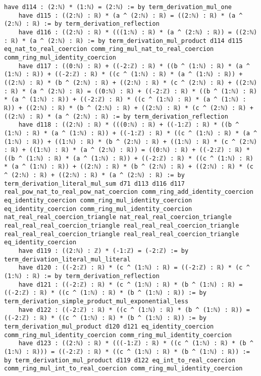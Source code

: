 \documentclass{article}
\begin{document}
\begin{tcolorbox}[colback=white!10, width=\linewidth]
\begin{lstlisting}[language=Lean4]
    have d114 : (2:ℕ) * (1:ℕ) = (2:ℕ) := by term_derivation_mul_one
    have d115 : ((2:ℕ) : ℝ) * (a ^ (2:ℕ) : ℝ) = ((2:ℕ) : ℝ) * (a ^ (2:ℕ) : ℝ) := by term_derivation_reflection
    have d116 : ((2:ℕ) : ℝ) * (((1:ℕ) : ℝ) * (a ^ (2:ℕ) : ℝ)) = ((2:ℕ) : ℝ) * (a ^ (2:ℕ) : ℝ) := by term_derivation_mul_product d114 d115 eq_nat_to_real_coercion comm_ring_mul_nat_to_real_coercion comm_ring_mul_identity_coercion
    have d117 : ((0:ℕ) : ℝ) + ((-2:ℤ) : ℝ) * ((b ^ (1:ℕ) : ℝ) * (a ^ (1:ℕ) : ℝ)) + ((-2:ℤ) : ℝ) * ((c ^ (1:ℕ) : ℝ) * (a ^ (1:ℕ) : ℝ)) + ((2:ℕ) : ℝ) * (b ^ (2:ℕ) : ℝ) + ((2:ℕ) : ℝ) * (c ^ (2:ℕ) : ℝ) + ((2:ℕ) : ℝ) * (a ^ (2:ℕ) : ℝ) = ((0:ℕ) : ℝ) + ((-2:ℤ) : ℝ) * ((b ^ (1:ℕ) : ℝ) * (a ^ (1:ℕ) : ℝ)) + ((-2:ℤ) : ℝ) * ((c ^ (1:ℕ) : ℝ) * (a ^ (1:ℕ) : ℝ)) + ((2:ℕ) : ℝ) * (b ^ (2:ℕ) : ℝ) + ((2:ℕ) : ℝ) * (c ^ (2:ℕ) : ℝ) + ((2:ℕ) : ℝ) * (a ^ (2:ℕ) : ℝ) := by term_derivation_reflection
    have d118 : ((2:ℕ) : ℝ) * (((0:ℕ) : ℝ) + ((-1:ℤ) : ℝ) * ((b ^ (1:ℕ) : ℝ) * (a ^ (1:ℕ) : ℝ)) + ((-1:ℤ) : ℝ) * ((c ^ (1:ℕ) : ℝ) * (a ^ (1:ℕ) : ℝ)) + ((1:ℕ) : ℝ) * (b ^ (2:ℕ) : ℝ) + ((1:ℕ) : ℝ) * (c ^ (2:ℕ) : ℝ) + ((1:ℕ) : ℝ) * (a ^ (2:ℕ) : ℝ)) = ((0:ℕ) : ℝ) + ((-2:ℤ) : ℝ) * ((b ^ (1:ℕ) : ℝ) * (a ^ (1:ℕ) : ℝ)) + ((-2:ℤ) : ℝ) * ((c ^ (1:ℕ) : ℝ) * (a ^ (1:ℕ) : ℝ)) + ((2:ℕ) : ℝ) * (b ^ (2:ℕ) : ℝ) + ((2:ℕ) : ℝ) * (c ^ (2:ℕ) : ℝ) + ((2:ℕ) : ℝ) * (a ^ (2:ℕ) : ℝ) := by term_derivation_literal_mul_sum d71 d113 d116 d117 real_pow_nat_to_real_pow_nat_coercion comm_ring_add_identity_coercion eq_identity_coercion comm_ring_mul_identity_coercion eq_identity_coercion comm_ring_mul_identity_coercion nat_real_real_coercion_triangle nat_real_real_coercion_triangle real_real_real_coercion_triangle real_real_real_coercion_triangle real_real_real_coercion_triangle real_real_real_coercion_triangle eq_identity_coercion
    have d119 : ((2:ℕ) : ℤ) * (-1:ℤ) = (-2:ℤ) := by term_derivation_literal_mul_literal
    have d120 : ((-2:ℤ) : ℝ) * (c ^ (1:ℕ) : ℝ) = ((-2:ℤ) : ℝ) * (c ^ (1:ℕ) : ℝ) := by term_derivation_reflection
    have d121 : ((-2:ℤ) : ℝ) * (c ^ (1:ℕ) : ℝ) * (b ^ (1:ℕ) : ℝ) = ((-2:ℤ) : ℝ) * ((c ^ (1:ℕ) : ℝ) * (b ^ (1:ℕ) : ℝ)) := by term_derivation_simple_product_mul_exponential_less
    have d122 : ((-2:ℤ) : ℝ) * ((c ^ (1:ℕ) : ℝ) * (b ^ (1:ℕ) : ℝ)) = ((-2:ℤ) : ℝ) * ((c ^ (1:ℕ) : ℝ) * (b ^ (1:ℕ) : ℝ)) := by term_derivation_mul_product d120 d121 eq_identity_coercion comm_ring_mul_identity_coercion comm_ring_mul_identity_coercion
    have d123 : ((2:ℕ) : ℝ) * (((-1:ℤ) : ℝ) * ((c ^ (1:ℕ) : ℝ) * (b ^ (1:ℕ) : ℝ))) = ((-2:ℤ) : ℝ) * ((c ^ (1:ℕ) : ℝ) * (b ^ (1:ℕ) : ℝ)) := by term_derivation_mul_product d119 d122 eq_int_to_real_coercion comm_ring_mul_int_to_real_coercion comm_ring_mul_identity_coercion

\end{lstlisting}
\end{tcolorbox}
\end{document}
